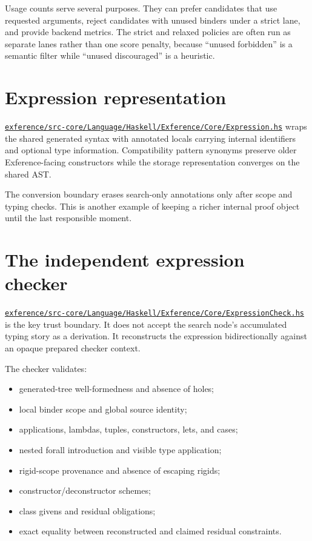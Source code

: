 \documentclass[10pt,letterpaper,oneside]{report}
\def\DjexBase{https://github.com/VladimirReshetnikov/Djex/blob/e454757d53ec057238c22fc6cd0d935b7d96b3dc/}
\newcommand{\dpath}[1]{\href{\DjexBase#1}{\nolinkurl{#1}}}
\begin{document}
Usage counts serve several purposes. They can prefer candidates that use requested arguments, reject candidates with unused binders under a strict lane, and provide backend metrics. The strict and relaxed policies are often run as separate lanes rather than one score penalty, because ``unused forbidden'' is a semantic filter while ``unused discouraged'' is a heuristic.

\section{Expression representation}

\dpath{exference/src-core/Language/Haskell/Exference/Core/Expression.hs} wraps the shared generated syntax with annotated locals carrying internal identifiers and optional type information. Compatibility pattern synonyms preserve older Exference-facing constructors while the storage representation converges on the shared AST.

The conversion boundary erases search-only annotations only after scope and typing checks. This is another example of keeping a richer internal proof object until the last responsible moment.

\section{The independent expression checker}\label{sec:exference-checker}

\dpath{exference/src-core/Language/Haskell/Exference/Core/ExpressionCheck.hs} is the key trust boundary. It does not accept the search node's accumulated typing story as a derivation. It reconstructs the expression bidirectionally against an opaque prepared checker context.

The checker validates:

\begin{itemize}
  \item generated-tree well-formedness and absence of holes;
  \item local binder scope and global source identity;
  \item applications, lambdas, tuples, constructors, lets, and cases;
  \item nested forall introduction and visible type application;
  \item rigid-scope provenance and absence of escaping rigids;
  \item constructor/deconstructor schemes;
  \item class givens and residual obligations;
  \item exact equality between reconstructed and claimed residual constraints.
\end{itemize}
\end{document}
